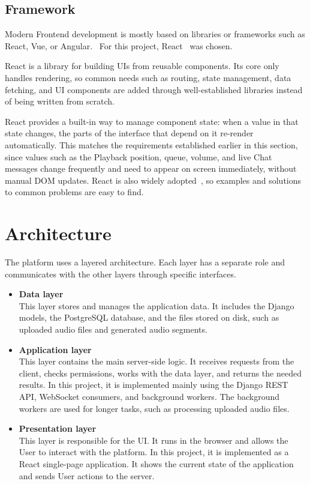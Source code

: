 \subsection{Framework}
Modern Frontend development is mostly based on libraries or frameworks
such as React, Vue, or Angular.~\parencite{frameworkdata}
For this project, React~\parencite{react} was chosen.

React is a library for building UIs from reusable components.
Its core only handles rendering, so common needs such as routing, state
management, data fetching, and UI components are added through well-established
libraries instead of being written from scratch.

React provides a built-in way to manage component state: when a value
in that state changes, the parts of the interface that depend on it
re-render automatically.
This matches the requirements established earlier in this section,
since values such as the Playback position, queue, volume, and live
Chat messages change frequently and need to appear on screen
immediately, without manual DOM updates.
React is also widely adopted~\parencite{so_react}, so examples and
solutions to common problems are easy to find.


\section{Architecture}
The platform uses a layered architecture. Each layer has a separate role
and communicates with the other layers through specific interfaces.

\begin{itemize}
    \item \textbf{Data layer}\\
    This layer stores and manages the application data. It includes the
    Django models, the PostgreSQL database, and the files stored on disk,
    such as uploaded audio files and generated audio segments.

    \item \textbf{Application layer}\\
    This layer contains the main server-side logic. It receives requests
    from the client, checks permissions, works with the data layer, and
    returns the needed results. In this project, it is implemented mainly
    using the Django REST API, WebSocket consumers, and background workers.
    The background workers are used for longer tasks, such as processing
    uploaded audio files.

    \item \textbf{Presentation layer}\\
    This layer is responsible for the UI. It runs in the
    browser and allows the User to interact with the platform. In this
    project, it is implemented as a React single-page application. It
    shows the current state of the application and sends User actions to
    the server.
\end{itemize}

